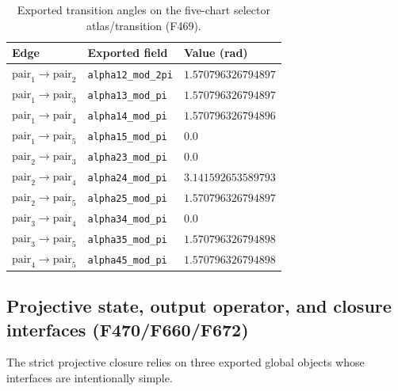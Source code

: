 \documentclass[11pt,a4paper]{article}
\begin{document}
\begin{table}[h]
  \centering
  \caption{Exported transition angles on the five-chart selector atlas/transition (F469).}
  \label{tab:f469_alphas}
  \begin{tabular}{lll}
    \toprule
    Edge & Exported field & Value (rad) \\
    \midrule
    $\mathrm{pair}_1\to \mathrm{pair}_2$ & \texttt{alpha12\_mod\_2pi} & $1.570796326794897$ \\
    $\mathrm{pair}_1\to \mathrm{pair}_3$ & \texttt{alpha13\_mod\_pi}  & $1.570796326794897$ \\
    $\mathrm{pair}_1\to \mathrm{pair}_4$ & \texttt{alpha14\_mod\_pi}  & $1.570796326794896$ \\
    $\mathrm{pair}_1\to \mathrm{pair}_5$ & \texttt{alpha15\_mod\_pi}  & $0.0$ \\
    $\mathrm{pair}_2\to \mathrm{pair}_3$ & \texttt{alpha23\_mod\_pi}  & $0.0$ \\
    $\mathrm{pair}_2\to \mathrm{pair}_4$ & \texttt{alpha24\_mod\_pi}  & $3.141592653589793$ \\
    $\mathrm{pair}_2\to \mathrm{pair}_5$ & \texttt{alpha25\_mod\_pi}  & $1.570796326794897$ \\
    $\mathrm{pair}_3\to \mathrm{pair}_4$ & \texttt{alpha34\_mod\_pi}  & $0.0$ \\
    $\mathrm{pair}_3\to \mathrm{pair}_5$ & \texttt{alpha35\_mod\_pi}  & $1.570796326794898$ \\
    $\mathrm{pair}_4\to \mathrm{pair}_5$ & \texttt{alpha45\_mod\_pi}  & $1.570796326794898$ \\
    \bottomrule
  \end{tabular}
\end{table}

\subsection{Projective state, output operator, and closure interfaces (F470/F660/F672)}
\label{sec:f672_interfaces}

The strict projective closure relies on three exported global objects whose interfaces are intentionally simple.
\end{document}
